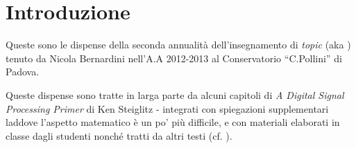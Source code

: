 %
%

\chapter{Introduzione}

Queste sono le dispense della seconda annualit\`a dell'insegnamento di \emph{topic}
(aka \emph{\topicacro}) tenuto da Nicola Bernardini nell'A.A 2012-2013 al
Conservatorio ``C.Pollini'' di Padova.

Queste dispense sono tratte in larga parte da alcuni capitoli di \emph{A Digital Signal Processing Primer}
di Ken Steiglitz \cite{steiglitz:adspp} - integrati
con spiegazioni supplementari laddove l'aspetto matematico \`e un po' pi\`u
difficile,
e con materiali elaborati in
classe dagli studenti
nonch\'e tratti da altri testi
(cf. \cite{steiglitz1974introduction, t1987digital, park2010introduction, shenoi2005introduction}).
